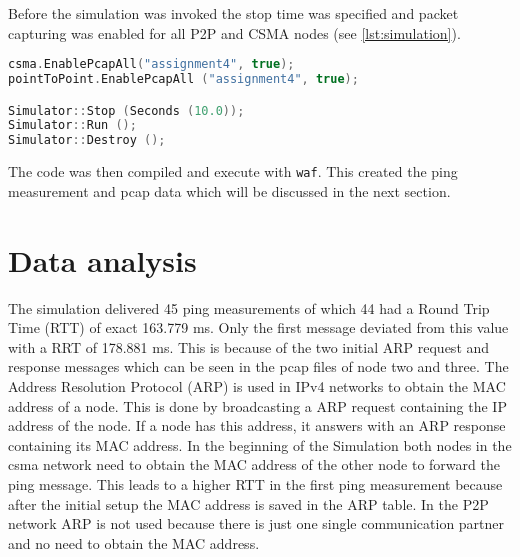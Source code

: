 \documentclass[parskip=full]{scrartcl}
\begin{document}
Before the simulation was invoked the stop time was specified and packet capturing was enabled for all P2P and CSMA nodes (see \cref{lst:simulation}).

\begin{lstlisting}[language=c++, frame=single , captionpos=b, caption={pcap and simulation start}, label=lst:simulation]
csma.EnablePcapAll("assignment4", true);
pointToPoint.EnablePcapAll ("assignment4", true);

Simulator::Stop (Seconds (10.0));
Simulator::Run ();
Simulator::Destroy ();
\end{lstlisting}

The code was then compiled and execute with \verb|waf|. This created the ping measurement and pcap data which will be discussed in the next section. 

\section{Data analysis} \label{sec:data}

% 


The simulation delivered 45 ping measurements of which 44 had a Round Trip Time (RTT) of exact 163.779 ms. 
Only the first message deviated from this value with a RRT of 178.881 ms. 
This is because of the two initial ARP request and response messages which can be seen in the pcap files of node two and three.
The Address Resolution Protocol (ARP) is used in IPv4 networks to obtain the MAC address of a node. 
This is done by broadcasting a ARP request containing the IP address of the node. 
If a node has this address, it answers with an ARP response containing its MAC address.
In the beginning of the Simulation both nodes in the csma network need to obtain the MAC address of the other node to forward the ping message.
This leads to a higher RTT in the first ping measurement because after the initial setup the MAC address is saved in the ARP table.
In the P2P network ARP is not used because there is just one single communication partner and no need to obtain the MAC address.
\end{document}
